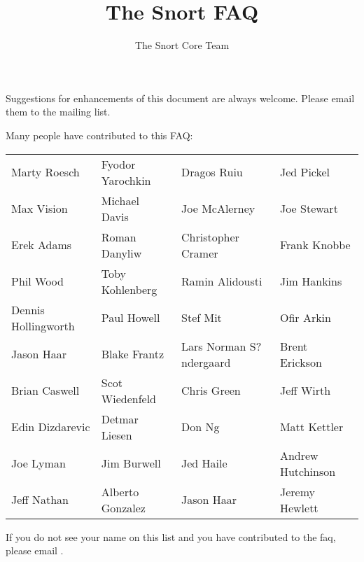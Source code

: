 \documentclass{article}
\begin{document}
\title{ The Snort FAQ }
\author{ The Snort Core Team }
\date{ }


\maketitle

\newpage

Suggestions for enhancements of this document are always welcome.  Please email them to the  mailing list. 

Many people have contributed to this FAQ:
\begin{center}
\begin{tabular}{llll}
 Marty Roesch   &  Fyodor Yarochkin    &   Dragos Ruiu      &     Jed Pickel\\

    Max Vision   &    Michael Davis     &   Joe McAlerney    &      Joe Stewart\\

    Erek Adams    &   Roman Danyliw   &   Christopher Cramer  &    Frank Knobbe\\

     Phil Wood     & Toby Kohlenberg   &   Ramin Alidousti     &    Jim Hankins\\

Dennis Hollingworth &  Paul Howell      &      Stef Mit         &   Ofir Arkin\\

    Jason Haar       & Blake Frantz &  Lars Norman S?ndergaard  & Brent Erickson\\

   Brian Caswell  &  Scot Wiedenfeld &       Chris Green        &   Jeff Wirth\\

  Edin Dizdarevic  &  Detmar Liesen   &         Don Ng       &     Matt Kettler\\

     Joe Lyman      &  Jim Burwell     &      Jed Haile      &   Andrew Hutchinson\\

    Jeff Nathan   &  Alberto Gonzalez   &     Jason Haar    &    Jeremy Hewlett
\end{tabular}
\end{center}





If you do not see your name on this list and you have contributed to the faq,
please email .
\end{document}
